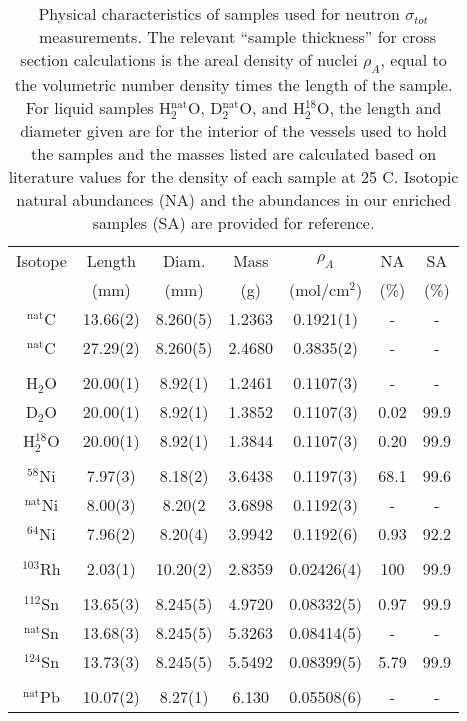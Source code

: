 \documentclass[twocolumn,secnumarabic,amssymb, nobibnotes, aps, prl,
superscriptaddress, nobalancelastpage, floatfix]{revtex4}
\newcommand{\tot}{\ensuremath{\sigma_{tot}}}
\begin{document}
\begin{table}[tb]
    \centering
    \caption{Physical characteristics of samples used for neutron \tot\ measurements.
    The relevant ``sample thickness'' for cross section calculations is the areal density of nuclei
        $\rho_{A}$, equal to the volumetric number density times
        the length of the sample. For liquid
        samples H$_{2}^{\text{nat}}$O, D$_{2}^{\text{nat}}$O, and H$_{2}^{18}$O,
        the length and diameter given are for the interior of the vessels
        used to hold the samples and the masses listed are calculated based on 
        literature values for the density of each sample at 25 C. Isotopic natural abundances (NA) and
        the abundances in our enriched samples (SA) are provided for reference.}

    \begin{tabular}{c c c c c c c}
        \small Isotope & Length & Diam. & Mass & $\rho_{A}$ & NA & SA\\
        \small & (mm) & (mm) & (g) & (mol/cm$^{2}$) & (\%) & (\%)\\
        \hline
        $^{\text{nat}}$C& 13.66(2)& 8.260(5)& 1.2363& 0.1921(1)& -& -\\
        $^{\text{nat}}$C& 27.29(2)& 8.260(5)& 2.4680& 0.3835(2)& -& -\\
        \\
        H$_{2}$O& 20.00(1)& 8.92(1)& 1.2461& 0.1107(3)& -& - \\
        D$_{2}$O& 20.00(1)& 8.92(1)& 1.3852& 0.1107(3)& 0.02& 99.9\\
        H$_{2}^{18}$O& 20.00(1)& 8.92(1)& 1.3844& 0.1107(3)& 0.20& 99.9\\
        \\
        $^{58}$Ni& 7.97(3)& 8.18(2)& 3.6438& 0.1197(3)& 68.1& 99.6 \\
        $^{\text{nat}}$Ni& 8.00(3)& 8.20(2 & 3.6898& 0.1192(3)& - & -\\
        $^{64}$Ni& 7.96(2)& 8.20(4)& 3.9942& 0.1192(6)& 0.93& 92.2\\
        \\
        $^{103}$Rh& 2.03(1)& 10.20(2)& 2.8359& 0.02426(4)& 100& 99.9\\
        \\
        $^{112}$Sn& 13.65(3)& 8.245(5)& 4.9720& 0.08332(5)& 0.97& 99.9\\
        $^{\text{nat}}$Sn& 13.68(3)& 8.245(5)& 5.3263& 0.08414(5)& - & -\\
        $^{124}$Sn& 13.73(3)& 8.245(5)& 5.5492& 0.08399(5)& 5.79& 99.9\\
        \\
        $^{\text{nat}}$Pb& 10.07(2)& 8.27(1)& 6.130& 0.05508(6)& -& -\\
        \hline
    \end{tabular}
    \centering
        \label{SampleCharacteristics}
\end{table}
\end{document}
